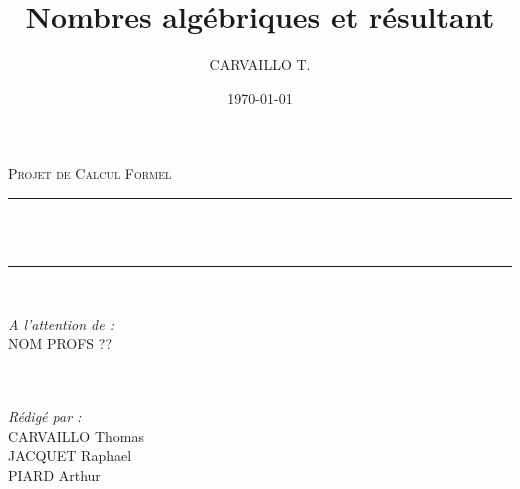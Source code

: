 \documentclass[12pt]{article}
\title{Nombres algébriques et résultant}
\author{CARVAILLO T.}
\date{\today}
\makeatletter
\let\thetitle\@title
\theoremstyle{definition}\newtheorem{defn}{Définition}
\theoremstyle{definition}\newtheorem{exm}{Exemple}
\theoremstyle{definition}\newtheorem{rem}{Remarque}
\theoremstyle{definition}\newtheorem{algo}{Algorithme}
\theoremstyle{remark}\newtheorem{exo}{Exercice}
\theoremstyle{remark}\newtheorem{nota}{Notation}
\makeatother
\begin{document}

\begin{titlepage}
	\centering
    \vspace*{0.5 cm}
    \textsc{\LARGE Projet de Calcul Formel}\\[1.0 cm]
	\vspace{1.5cm}
	\rule{\linewidth}{0.2 mm} \\[0.4 cm]
	{ \huge \bfseries  \thetitle}\\ %
	\rule{\linewidth}{0.2 mm} \\[1.5 cm]
	
	\begin{minipage}{0.4\textwidth}
		\begin{flushleft} \large
			\emph{A l'attention de :}\\
			NOM PROFS ??\\
			\phantom{a}\\
			\phantom{a}\\
		\end{flushleft}
	\end{minipage}
	\begin{minipage}{0.5\textwidth}
    	\begin{flushright} \large
		\emph{Rédigé par :}\\
		CARVAILLO Thomas \\
		JACQUET Raphael \\
		PIARD Arthur
		\end{flushright}
	\end{minipage}\\[2 cm]
\end{titlepage}


\tableofcontents

\end{document}
